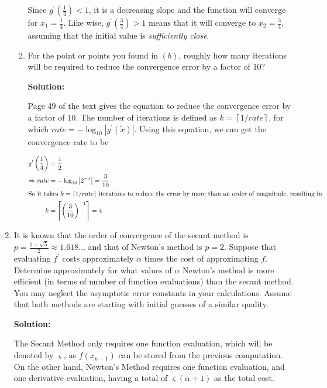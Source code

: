\documentclass[12pt]{article}
\newcommand{\abs}[1]{\left| #1 \right|}
\newcommand{\ceil}[1]{\left\lceil #1 \right\rceil}
\begin{document}
\begin{enumerate}
\begin{enumerate}
    Since $g^{\prime}\left(\frac{1}{4}\right) < 1$, it is a decreasing slope and the function will converge
    for $x_{1} = \frac{1}{4}$. Like wise, $g^{\prime}\left(\frac{3}{4}\right) > 1$ means that it will converge
    to $x_{2} = \frac{3}{4}$, assuming that the initial value is {\em sufficiently close}.
  \item For the point or points you found in $(b)$, roughly how many iterations will be
  required to reduce the convergence error by a factor of 10?

  {\bf Solution:}

  Page 49 of the text gives the equation to reduce the convergence error by a factor of 10.
  The number of iterations is defined as $k = \ceil{1/rate}$, for which $rate = -\log_{10}\abs{g^{\prime}\left( \widetilde{x}\right)}$.
  Using this equation, we can get the convergence rate to be

  \begin{align*}
    g^{\prime}\left( \frac{1}{4}\right) &= \frac{1}{2}\\
    \Rightarrow rate &= -\log_{10}\abs{2^{-1}} = \frac{3}{10}\\
    \intertext{So it takes $k = \ceil{1/rate}$ iterations to reduce the error by more than an order of magnitude, resulting in}
    k &= \ceil{\left( \frac{3}{10}\right)^{-1}} = 4
  \end{align*}
\end{enumerate}

\item It is known that the order of convergence of the secant method is $p = \frac{1 + \sqrt{5}}{2} \approx 1.618\ldots$
and that of Newton's method is $p = 2$. Suppose that evaluating $f^{\prime}$ costs approximately
$\alpha$ times the cost of approximating $f$. Determine approximately for what values of $\alpha$
Newton's method is more efficient (in terms of number of function evaluations) than the secant method.
You may neglect the asymptotic error constants in your calculations. Assume that both methods
are starting with initial guesses of a similar quality.

{\bf Solution:}

The Secant Method only requires one function evaluation, which will be denoted by $\varsigma$,
as $f\left(x_{n-1}\right)$ can be stored from the previous computation. On the other hand,
Newton's Method requires one function evaluation, and one derivative evaluation, having a total
of $\varsigma(\alpha + 1)$ as the total cost.


\end{enumerate}
\end{document}
